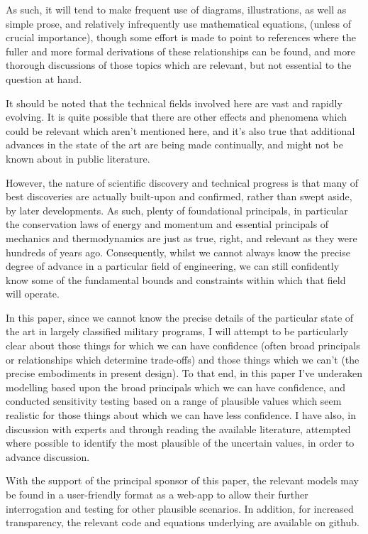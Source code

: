 \documentclass{article}\usepackage[]{graphicx}\usepackage[]{color}
\begin{document}
As such, it will tend to make frequent use of diagrams, illustrations, as well as simple prose, and relatively infrequently use mathematical equations, (unless of crucial importance), though some effort is made to point to references where the fuller and more formal derivations of these relationships can be found, and more thorough discussions of those topics which are relevant, but not essential to the question at hand.

It should be noted that the technical fields involved here are vast and rapidly evolving.  It is quite possible that there are other effects and phenomena which could be relevant which aren't mentioned here, and it's also true that additional advances in the state of the art are being made continually, and might not be known about in public literature.

However, the nature of scientific discovery and technical progress is that many of best discoveries are actually built-upon and confirmed, rather than swept aside, by later developments.  As such, plenty of foundational principals, in particular the conservation laws of energy and momentum and essential principals of mechanics and thermodynamics are just as true, right, and relevant as they were hundreds of years ago.  Consequently, whilst we cannot always know the precise degree of advance in a particular field of engineering, we can still confidently know some of the fundamental bounds and constraints within which that field will operate.

In this paper, since we cannot know the precise details of the particular state of the art in largely classified military programs, I will attempt to be particularly clear about those things for which we can have confidence (often broad principals or relationships which determine trade-offs) and those things which we can't (the precise embodiments in present design).  To that end, in this paper I've underaken modelling based upon the broad principals which we can have confidence, and conducted sensitivity testing based on a range of plausible values which seem realistic for those things about which we can have less confidence. I have also, in discussion with experts and through reading the available literature, attempted where possible to identify the most plausible of the uncertain values, in order to advance discussion.

With the support of the principal sponsor of this paper, the relevant models may be found in a user-friendly format as a web-app to allow their further interrogation and testing for other plausible scenarios.  In addition, for increased transparency, the relevant code and equations underlying are available on github.
\end{document}
